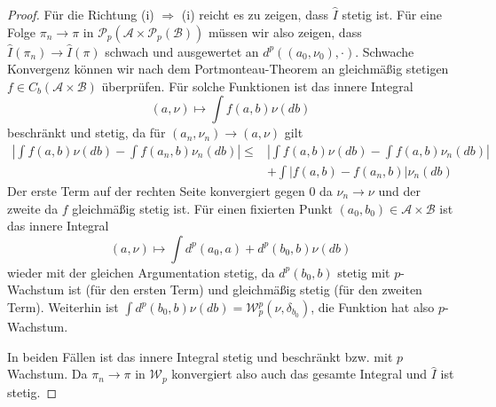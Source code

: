 \begin{proof}
    Für die Richtung (i) $\Rightarrow$ (i) reicht es zu zeigen, dass $\hat{I}$ stetig ist. Für eine Folge $\pi_n \rightarrow \pi$ in $\mathcal{P}_p(\mathcal{A} \times \mathcal{P}_p(\mathcal{B}))$ müssen wir also zeigen, dass $\hat{I}(\pi_n) \rightarrow \hat{I}(\pi)$ schwach und ausgewertet an $d^p((a_0, \nu_0), \cdot)$. Schwache Konvergenz können wir nach dem Portmonteau-Theorem an gleichmäßig stetigen $f \in C_b(\mathcal{A} \times \mathcal{B})$ überprüfen. Für solche Funktionen ist das innere Integral
    $$(a, \nu) \mapsto \int f(a, b) \nu(db)$$
    beschränkt und stetig, da für $(a_n, \nu_n) \rightarrow (a, \nu)$ gilt
    \begin{align*}
        \left| \int f(a,b) \nu(db) - \int f(a_n, b) \nu_n(db) \right| \leq  
        &\left|\int  f(a,b) \nu(db) - \int f(a,b) \nu_n(db) \right| \\
        &+\int \left|f(a, b) - f(a_n, b) \right|\nu_n(db)  
    \end{align*}
    Der erste Term auf der rechten Seite konvergiert gegen 0 da $\nu_n \rightarrow \nu$ und der zweite da $f$ gleichmäßig stetig ist. Für einen fixierten Punkt $(a_0, b_0) \in \mathcal{A} \times \mathcal{B}$ ist das innere Integral
    $$ (a, \nu) \mapsto \int d^p(a_0, a) +d^p(b_0, b) \nu(db)$$
    wieder mit der gleichen Argumentation stetig, da $d^p(b_0, b)$ stetig mit $p$-Wachstum ist (für den ersten Term) und gleichmäßig stetig (für den zweiten Term). Weiterhin ist $\int d^p(b_0, b)\nu(db) = \mathcal{W}_p^p(\nu, \delta_{b_0})$, die Funktion hat also $p$-Wachstum.

    In beiden Fällen ist das innere Integral stetig und beschränkt bzw. mit $p$ Wachstum. Da $\pi_n \rightarrow \pi$ in $\mathcal{W}_p$ konvergiert also auch das gesamte Integral und $\hat{I}$ ist stetig.


\end{proof}

